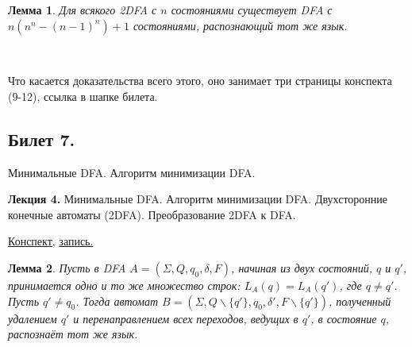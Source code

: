 \documentclass[a4paper]{article}
\newcommand{\mybox}{%
    \collectbox{%
        \setlength{\fboxsep}{1pt}%
        \fbox{\BOXCONTENT}%
    }%
}
\theoremstyle{indented}
\newtheorem{lemma}{Лемма}
\theoremstyle{definition}
\theoremstyle{remark}
\begin{document}
\begin{lemma}
    Для всякого 2DFA с $n$ состояниями существует DFA с $n(n^n - (n - 1)^n) + 1$ состояниями, распознающий тот же язык.
\end{lemma} \ 

Что касается доказательства всего этого, оно занимает три страницы конспекта (9-12), ссылка в шапке билета.



\newpage 

\subsection{Билет 7.}

Минимальные DFA. Алгоритм минимизации DFA.

\hrulefill

\textbf{Лекция 4.} Минимальные DFA. Алгоритм минимизации DFA. Двухсторонние конечные автоматы (2DFA). Преобразование 2DFA к DFA.

\begin{flushright}
    \mybox{
        \href{https://users.math-cs.spbu.ru/~okhotin/teaching/tcs_fl_2021/okhotin_tcs_fl_2021_l4.pdf}{Конспект,}
        \href{https://disk.yandex.ru/d/knoQ44wLmGDwwQ/2021-2022%20учебный%20год%20(осенний%20семестр)/2%20курс/Теоретическая%20информатика/Теор%20информатика%2C%20лекция%2C%2022.09.2021%20.mp4}{запись.}
    }
\end{flushright}

\begin{lemma}
    Пусть в DFA $A = (\Sigma, Q, q_0, \delta, F )$, начиная из двух состояний, $q$ и $q'$, принимается одно и то же множество строк: $L_A(q) = L_A(q')$, где $q\neq q'$. Пусть $q'\neq q_0$. Тогда автомат $B = (\Sigma,Q \backslash \{q'\},q_0,\delta',F \backslash \{q'\})$, полученный удалением $q'$ и перенаправлением всех переходов, ведущих в $q'$, в состояние $q$, распознаёт тот же язык.
\end{lemma} 
\end{document}
